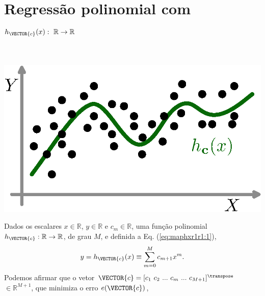 \section{Regressão polinomial com
$h_{\VECTOR{c}}(x):~\mathbb{R} \rightarrow \mathbb{R}$}
\label{sec:theo:maphxr1r1}



\begin{theorem}
\label{theo:maphxr1r1}
~\\
\begin{minipage}{0.4\textwidth}
\centering
\includegraphics[width=0.95\linewidth]{chapters/mapeamento/mapeamento-hx.eps} 
\end{minipage}
\begin{minipage}{0.6\textwidth}
Dados
os escalares $x \in \mathbb{R}$, $y \in \mathbb{R}$ e $c_m \in \mathbb{R}$,
uma função polinomial $h_{\VECTOR{c}}:\mathbb{R} \rightarrow \mathbb{R}$, de grau $M$, e 
definida a Eq. (\ref{eq:maphxr1r1:1}),
\begin{equation}\label{eq:maphxr1r1:1}
y=h_{\VECTOR{c}}(x)\equiv \sum_{m=0}^{M}c_{m+1} x^m.
\end{equation}
Podemos afirmar que o vetor $\VECTOR{c}=[c_1~ c_2~ ...~ c_m~ ...~ c_{M+1}]^{\transpose}$ $\in \mathbb{R}^{M+1}$,
que minimiza o erro $e(\VECTOR{c})$,
\end{minipage}


\end{theorem}
